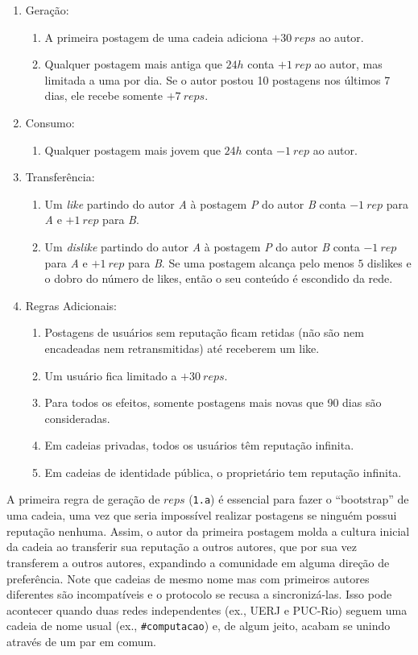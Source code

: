 \documentclass[12pt]{article}
\begin{document}
\begin{enumerate}
\item Geração:
    \begin{enumerate}
    \item A primeira postagem de uma cadeia adiciona $+30~reps$ ao autor.
    \item Qualquer postagem mais antiga que $24h$ conta $+1~rep$ ao autor, mas
          limitada a uma por dia. Se o autor postou 10 postagens nos últimos 7
          dias, ele recebe somente $+7~reps$.
    \end{enumerate}
\item Consumo:
    \begin{enumerate}
    \item Qualquer postagem mais jovem que $24h$ conta $-1~rep$ ao autor.
    \end{enumerate}
\item Transferência:
    \begin{enumerate}
    \item Um \emph{like}    partindo do autor \emph{A} à postagem \emph{P} do
          autor \emph{B} conta $-1~rep$ para \emph{A} e $+1~rep$ para \emph{B}.
    \item Um \emph{dislike} partindo do autor \emph{A} à postagem \emph{P} do
          autor \emph{B} conta $-1~rep$ para \emph{A} e $+1~rep$ para \emph{B}.
          Se uma postagem alcança pelo menos $5$ dislikes e o dobro do número
          de likes, então o seu conteúdo é escondido da rede.
    \end{enumerate}
\item Regras Adicionais:
    \begin{enumerate}
    \item Postagens de usuários sem reputação ficam retidas (não são nem
          encadeadas nem retransmitidas) até receberem um like.
    \item Um usuário fica limitado a $+30~reps$.
    \item Para todos os efeitos, somente postagens mais novas que 90 dias são
          consideradas.
    \item Em cadeias privadas, todos os usuários têm reputação infinita.
    \item Em cadeias de identidade pública, o proprietário tem reputação
          infinita.
    \end{enumerate}
\end{enumerate}
%
A primeira regra de geração de $reps$ (\texttt{1.a}) é essencial para fazer o
``bootstrap'' de uma cadeia, uma vez que seria impossível realizar postagens se
ninguém possui reputação nenhuma.
Assim, o autor da primeira postagem molda a cultura inicial da cadeia ao
transferir sua reputação a outros autores, que por sua vez transferem a outros
autores, expandindo a comunidade em alguma direção de preferência.
%
Note que cadeias de mesmo nome mas com primeiros autores diferentes são
incompatíveis e o protocolo se recusa a sincronizá-las.
Isso pode acontecer quando duas redes independentes (ex., UERJ e PUC-Rio)
seguem uma cadeia de nome usual (ex., \texttt{\#computacao}) e, de algum jeito,
acabam se unindo através de um par em comum.
\end{document}

